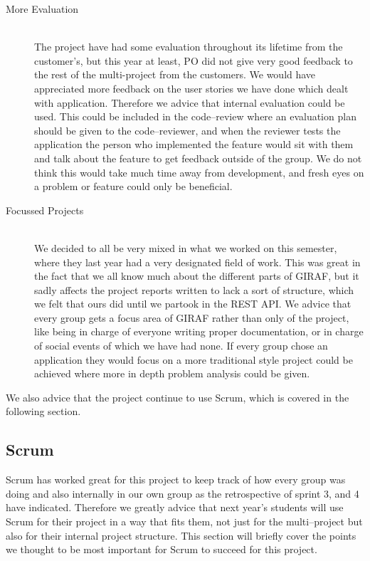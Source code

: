 \begin{description}
	\item[More Evaluation] \hfill \\
	The project have had some evaluation throughout its lifetime from the customer's, but this year at least, PO did not give very good feedback to the rest of the multi-project from the customers.
	We would have appreciated more feedback on the user stories we have done which dealt with application.
	Therefore we advice that internal evaluation could be used.
	This could be included in the code--review where an evaluation plan should be given to the code--reviewer, and when the reviewer tests the application the person who implemented the feature would sit with them and talk about the feature to get feedback outside of the group.
	We do not think this would take much time away from development, and fresh eyes on a problem or feature could only be beneficial.

	\item[Focussed Projects] \hfill \\
	We decided to all be very mixed in what we worked on this semester, where they last year had a very designated field of work.
	This was great in the fact that we all know much about the different parts of GIRAF, but it sadly affects the project reports written to lack a sort of structure, which we felt that ours did until we partook in the REST API.
	We advice that every group gets a focus area of GIRAF rather than only of the project, like being in charge of everyone writing proper documentation, or in charge of social events of which we have had none.
	If every group chose an application they would focus on a more traditional style project could be achieved where more in depth problem analysis could be given.
\end{description}
We also advice that the project continue to use Scrum, which is covered in the following section.

\subsection{Scrum}
Scrum has worked great for this project to keep track of how every group was doing and also internally in our own group as the retrospective of sprint 3, and 4 have indicated.
Therefore we greatly advice that next year's students will use Scrum for their project in a way that fits them, not just for the multi--project but also for their internal project structure.
This section will briefly cover the points we thought to be most important for Scrum to succeed for this project.

